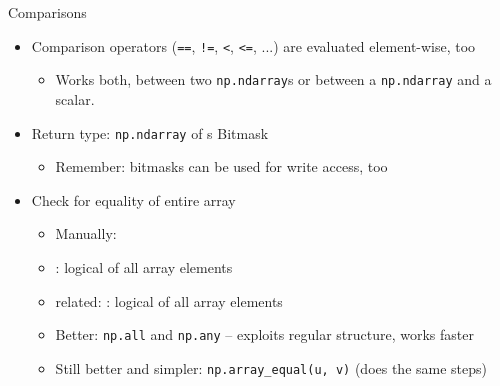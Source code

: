 
\begin{frame}[fragile]{Comparisons}
%
\begin{itemize}
\item Comparison operators (\texttt{==}, \texttt{!=}, \texttt{<}, \texttt{<=}, ...) are evaluated element-wise, too
	\begin{itemize}
	\item Works both, between two \texttt{np.ndarray}s or between a \texttt{np.ndarray} and a scalar.
	\end{itemize}
\item Return type: \texttt{np.ndarray} of s \Thus Bitmask
	\begin{itemize}
	\item Remember: bitmasks can be used for write access, too
	\end{itemize}
\item Check for equality of entire array
	\begin{itemize}
	\item Manually: 
	\item {}: logical  of all array elements
	\item related: : logical  of all array elements
	\item Better: \texttt{np.all} and \texttt{np.any} -- exploits regular structure, works faster
	\item Still better and simpler: \texttt{np.array\_equal(u, v)} (does the same steps)
	\end{itemize}
\end{itemize}
%
\end{frame}


